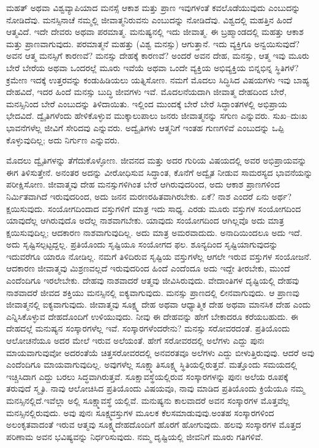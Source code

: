 ಮಹತ್​ ಅಥವಾ ವಿಶ್ವವ್ಯಾಪಿಯಾದ ಮನಸ್ಸೆ ಆಕಾಶ ಮತ್ತು ಪ್ರಾಣ ಇವುಗಳಂತೆ ಕವಲೊಡೆಯುವುದು ಎಂಬುದನ್ನು ನೋಡಿದೆವು. ಮನಸ್ಸಿನಾಚೆ ನಮ್ಮಲ್ಲಿ ಜೀವಾತ್ಮನಿರುವನು ಎಂಬುದನ್ನು ನೋಡಿದೆವು. ವಿಶ್ವದಲ್ಲಿ ಮಹತ್ತಿನ ಹಿಂದೆ ಆತ್ಮವಿದೆ. ಇದೇ ದೇವರು ಅಥವಾ ಪರಮಾತ್ಮ. ಮನುಷ್ಯನಲ್ಲಿ ಇದು ಜೀವಾತ್ಮ. ಈ ಬ್ರಹ್ಮಾಂಡದಲ್ಲಿ ಮಹತ್ತು ಆಕಾಶ ಮತ್ತು ಪ್ರಾಣವಾಗುವುದು. ಪರಮಾತ್ಮನೆ ಮಹತ್ತು (ವಿಶ್ವ ಮನಸ್ಸು) ಆಗುತ್ತಾನೆ. ಇದು ವ್ಯಕ್ತಿಗೂ ಅನ್ವಯಿಸುವುದೆ? ಅವನ ಆತ್ಮ ಮನಸ್ಸಿಗೆ ಕಾರಣವೆ? ಮನಸ್ಸು ದೇಹಕ್ಕೆ ಕಾರಣವೆ? ಅಂದರೆ ಅವನ ದೇಹ, ಮನಸ್ಸು, ಆತ್ಮ ಇವು ಮೂರು ಬೇರೆ ಬೇರೆಯ ಅಥವಾ ಒಂದರಲ್ಲೆ ಮೂರು ಇವೆಯೆ ಅಥವಾ ಒಂದೇ ವ್ಯಕ್ತಿಯ ಅಭಿವ್ಯಕ್ತಿಯ ಬಿನ್ನಭಿನ್ನ ಸ್ಥಿತಿಗಳೆ? ಕ್ರಮೇಣ ಇದಕ್ಕೆ ಉತ್ತರವನ್ನು ಕಂಡುಹಿಡಿಯಲು ಯತ್ನಿಸೋಣ. ನಮಗೆ ಮೊದಲು ಸಿದ್ಧಿಸಿದ ವಿಷಯಗಳು ಇವು ಬಾಹ್ಯ ದೇಹವಿದೆ, ಇದರ ಹಿಂದೆ ಮನಸ್ಸು ಬುದ್ಧಿ ಜೀವಗಳು ಇವೆ. ಮೊದಲನೆಯದಾಗಿ ಜೀವಾತ್ಮ ದೇಹದಿಂದ ಬೇರೆ, ಮನಸ್ಸಿನಿಂದ ಬೇರೆ ಎಂಬುದನ್ನು ತಿಳಿದಾಯಿತು. ಇಲ್ಲಿಂದ ಮುಂದಕ್ಕೆ ಬೇರೆ ಬೇರೆ ಸಿದ್ಧಾಂತಗಳಲ್ಲಿ ಅಭಿಪ್ರಾಯ ಭೇದವಿದೆ. ದ್ವೈತಿಗಳೆಂದು ಹೇಳಿಕೊಳ್ಳುವ ಮುಕ್ಕಾಲುಪಾಲು ಜನರು ಜೀವಾತ್ಮನನ್ನು ಸಗುಣ ಎನ್ನುವರು. ಸುಖ–ದುಃಖ ಭಾವನೆಗಳೆಲ್ಲ ಜೀವಿಗೆ ಸೇರಿದವು ಎನ್ನುವರು. ಅದ್ವೈತಿಗಳು ಆತ್ಮನಿಗೆ ಇಂತಹ ಗುಣಗಳಿವೆ ಎಂಬುದನ್ನು ಒಪ್ಪಿ ಕೊಳ್ಳುವುದಿಲ್ಲ; ಅದು ನಿರ್ಗುಣ ಎನ್ನುವರು.

ಮೊದಲು ದ್ವೈತಿಗಳನ್ನು ತೆಗೆದುಕೊಳ್ಳೋಣ. ಜೀವನದ ಮತ್ತು ಅದರ ಗುರಿಯ ವಿಷಯದಲ್ಲಿ ಅವರ ಅಭಿಪ್ರಾಯವನ್ನು ಈಗ ತಿಳಿಸುತ್ತೇನೆ. ಅನಂತರ ಅದನ್ನು ವೀರೋಧಿಸುವ ಸಿದ್ಧಾಂತ, ಕೊನೆಗೆ ಅದ್ವೈತ ನೀಡುವ ಸಾಮರಸ್ಯದ ಭಾವನೆಯನ್ನು ಪರೀಕ್ಷಿಸೋಣ. ಜೀವಾತ್ಮವು ದೇಹ ಮನಸ್ಸುಗಳಿಗಿಂತ ಬೇರೆ ಆಗಿರುವುದರಿಂದ, ಅದು ಆಕಾಶ ಪ್ರಾಣಗಳಿಂದ ನಿರ್ಮಿತವಾಗಿದೆ ಇರುವುದರಿಂದ, ಅದು ಜನನ ಮರಣರಹಿತವಾಗಿರಬೇಕು. ಏಕೆ? ನಾಶ ಎಂದರೆ ಏನು ಅರ್ಥ? ಕ್ಷಯಿಸುವುದು. ಸಂಯೋಗದಿಂದಾದ ವಸ್ತುಗಳಿಗೆ ಮಾತ್ರ ಇದು ಸಾಧ್ಯ. ಎರಡು ಮೂರು ವಸ್ತುಗಳ ಸಂಯೋಗದಿಂದ ಯಾವುದೆಲ್ಲ ಆಗಿರುವುದೊ ಅದೆಲ್ಲ ನಾಶವಾಗಬೇಕು. ಯಾವುದು ಸಂಯೋಗದಿಂದ ಆಗಿಲ್ಲವೊ ಅದು ಮಾತ್ರ ಕ್ಷಯಿಸುವುದಿಲ್ಲ; ಆದಕಾರಣ ನಾಶವಾಗುವುದಿಲ್ಲ. ಅದು ಮಾತ್ರ ಅಮರವಾದುದು. ಅನಾದಿಯಿಂದಲೂ ಅದು ಇದೆ. ಅದು ಸೃಷ್ಟಿಸಲ್ಪಟ್ಟದ್ದಲ್ಲ. ಪ್ರತಿಯೊಂದು ಸೃಷ್ಟಿಯೂ ಸಂಯೋಗದ ಫಲ. ಶೂನ್ಯದಿಂದ ಸೃಷ್ಟಿಯಾಗುವುದನ್ನು ಇದುವರೆಗೂ ಯಾರೂ ನೋಡಿಲ್ಲ. ನಮಗೆ ತಿಳಿದಿರುವ ಸೃಷ್ಟಿಯ ವಸ್ತುಗಳೆಲ್ಲ ಆಗಲೇ ಇರುವ ವಸ್ತುಗಳ ಸಂಯೋಜನೆ. ಆದಕಾರಣ ಜೀವಾತ್ಮವು ಮಿಶ್ರಣವಲ್ಲದೆ ಇರುವುದರಿಂದ ಹಿಂದೆ ಎಂದೆಂದೂ ಅದು ಇದ್ದೇ ತೀರಬೇಕು, ಮುಂದೆ ಎಂದೆಂದಿಗೂ ಇರಲೇಬೇಕು. ದೇಹವು ನಾಶವಾದರೆ ಆತ್ಮವು ಜೀವಿಸಿರುವುದು. ವೇದಾಂತಿಗಳ ದೃಷ್ಟಿಯಲ್ಲಿ ದೇಹವು ನಾಶವಾದರೆ ಜೀವದ ಶಕ್ತಿಯು ಮನಸ್ಸಿನಲ್ಲಿ ಐಕ್ಯವಾಗುವುದು. ಮನಸ್ಸು ಪ್ರಾಣದಲ್ಲಿ ಲೀನವಾಗುವುದು. ಆ ಪ್ರಾಣವು ಜೀವಾತ್ಮನಲ್ಲಿ ಐಕ್ಯವಾಗುವುದು. ಜೀವಾತ್ಮವು ಸೂಕ್ಷ್ಮ ದೇಹ ಅಥವಾ ಆಧ್ಯಾತ್ಮಿಕ ದೇಹ ಅಥವಾ ಮಾನಸಿಕ ದೇಹ ಎಂದು ಎನ್ನಿಸಿಕೊಳ್ಳುವ ದೇಹದೊಂದಿಗೆ ಉಳಿಯುವುದು. ನೀವು ಈ ದೇಹವನ್ನು ಹೇಗೆ ಬೇಕಾದರೂ ಕರೆಯಬಹುದು. ಈ ದೇಹದಲ್ಲೆ ಮನುಷ್ಯನ ಸಂಸ್ಕಾರಗಳೆಲ್ಲ ಇವೆ. ಸಂಸ್ಕಾರಗಳೆಂದರೇನು? ಮನಸ್ಸು ಸರೋವರದಂತೆ. ಪ್ರತಿಯೊಂದು ಆಲೋಚನೆಯೂ ಅದರ ಮೇಲೆ ಇರುವ ಅಲೆಯಂತೆ. ಹೇಗೆ ಸರೋವರದಲ್ಲಿ ಅಲೆಗಳು ಎದ್ದು ಪುನಃ ಮಾಯವಾಗುವುವೋ ಅದರಂತೆಯೆ ಚಿತ್ತಸರೋವರದಲ್ಲಿ ಅನವರತವೂ ಅಲೆಗಳು ಎದ್ದು ಬೀಳುತ್ತಿರುವುವು. ಆದರೆ ಅವು ಎಂದೆಂದಿಗೂ ಮಾಯವಾಗುವುದಿಲ್ಲ. ಅವುಗಳೆಲ್ಲ ಸೂಕ್ಷ್ಮಾತಿಸೂಕ್ಷ್ಮ ಸ್ಥಿತಿಯಲ್ಲಿರುತ್ತವೆ. ಮತ್ತೊಂದು ಸಮಯದಲ್ಲಿ ಇಚ್ಚಿಸಿದಾಗ ಎದ್ದು ಬರಲು ಸಿದ್ಧವಾಗಿರುತ್ತವೆ. ಸೂಕ್ಷಾವಸ್ಥೆಯಲ್ಲಿರುವ ಸಂಸ್ಕಾರಗಳನ್ನು ಪುನಃ ಅಲೆಯ ರೂಪಕ್ಕೆ ತರುವುದೆ ಸ್ಮೃತಿ. ನಾವು ಆಲೋಚಿಸಿದ ಪ್ರತಿಯೊಂದು ವಿಷಯವೂ, ನಾವು ಮಾಡಿದ ಪ್ರತಿಯೊಂದು ಕ್ರಿಯೆಯೂ ನಮ್ಮ ಮನಸ್ಸಿನಲ್ಲಿದೆ.ಇವೆಲ್ಲಾ ಅಲ್ಲಿ ಸೂಕ್ಷ್ಮಾವಸ್ಥೆ ಯಲ್ಲಿವೆ. ಮನುಷ್ಯನು ಕಾಲವಾದರೆ ಅವನ ಸಂಸ್ಕಾರಗಳ ಮೊತ್ತವೆಲ್ಲ ಮನಸ್ಸಿನಲ್ಲಿರುವುದು. ಅವು ಪುನಃ ಸೂಕ್ಷ್ಮವಸ್ತುಗಳ ಮೂಲಕ ಕೆಲಸಮಾಡುವುವು.ಅಂತಹ ಸಂಸ್ಕಾರಗಳಿಂದ ಅಲಂಕೃತವಾದಂತೆ ಇರುವ ಆತ್ಮವು ಸೂಕ್ಷ್ಮದೇಹದೊಂದಿಗೆ ಹೊರಗೆ ಹೋಗುವುದು. ಹಲವು ಸಂಸ್ಕಾರಗಳ ಮೊತ್ತದ ಪರಿಣಾಮ ಅವನ ಭವಿಷ್ಯವನ್ನು ನಿರ್ಧರಿಸುವುದು. ನಮ್ಮ ದೃಷ್ಟಿಯಲ್ಲಿ ಜೀವನಿಗೆ ಮೂರು ಗತಿಗಳಿವೆ.

